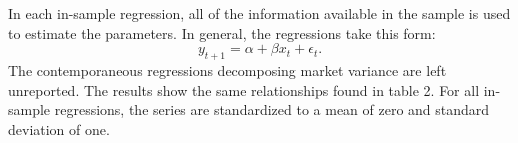 In each in-sample regression, all of the information available in the sample is used to estimate the parameters. In general, the regressions take this form: 
\begin{equation}
	y_{t+1} = \alpha + \beta x_{t} + \epsilon_{t}.
\end{equation}
The contemporaneous regressions decomposing market variance are left unreported. The results show the same relationships found in  \citet{pollet_average_2010} table 2. For all in-sample regressions, the series are standardized to a mean of zero and standard deviation of one.

